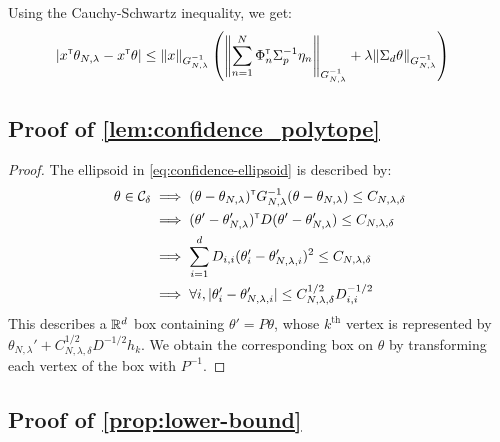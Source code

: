 \documentclass{article}
\begin{document}
Using the Cauchy-Schwartz inequality, we get:
\begin{align*}
    |x^{\mathsf{\scriptscriptstyle T}}\theta_{N,\lambda}  -x^{\mathsf{\scriptscriptstyle T}}\theta| &\leq \|x\|_{G_{N, \lambda}^{-1}}\left(\left\|\sum_{n=1}^N \Phi_n^{\mathsf{\scriptscriptstyle T}} \Sigma_p^{-1}\eta_n\right\|_{G_{N, \lambda}^{-1}} + \lambda\|\Sigma_d\theta\|_{G_{N, \lambda}^{-1}}\right)
\end{align*}

\subsection{Proof of \autoref{lem:confidence_polytope}}

\begin{proof}
The ellipsoid in \eqref{eq:confidence-ellipsoid} is described by:
\begin{align*}
    \theta\in\mathcal{C}_\delta &\implies
    (\theta-\theta_{N,\lambda})^{\mathsf{\scriptscriptstyle T}} G_{N,\lambda}^{-1}(\theta-\theta_{N,\lambda}) \leq C_{N,\lambda,\delta}\\
    &\implies (\theta'-\theta'_{N,\lambda})^{\mathsf{\scriptscriptstyle T}} D (\theta'-\theta'_{N,\lambda}) \leq C_{N,\lambda,\delta}\\
    &\implies \sum_{i=1}^d D_{i,i}(\theta'_i-\theta'_{N,\lambda,i})^2\leq C_{N,\lambda,\delta}\\
    &\implies\forall i, |\theta'_i-\theta'_{N,\lambda,i}|\leq C_{N,\lambda,\delta}^{1/2}D_{i,i}^{-1/2}
\end{align*}
This describes a $\mathbb{R}^d$ box containing $\theta' = P\theta$, whose $k^\text{th}$ vertex is represented by $\theta_{N,\lambda}' + C_{N,\lambda,\delta}^{1/2}D^{-1/2} h_k$. We obtain the corresponding box on $\theta$ by transforming each vertex of the box with $P^{-1}$.
\end{proof}

\subsection{Proof of \autoref{prop:lower-bound}}
\end{document}
